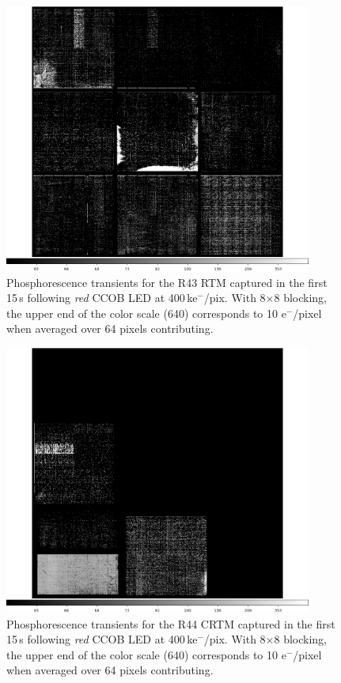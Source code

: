\begin{figure}[!htbp]
\centering
\includegraphics[width=0.9\textwidth]{figures/phosphorescence-survey/itl_fluor_R43_0-19_rb1_log.png}
\caption{Phosphorescence transients for the R43 RTM captured in the first 15\,s following {\it red} CCOB LED at 400\,ke$^-$/pix. With 8$\times$8 blocking, the upper end of the color scale (640) corresponds to 10 e$^-$/pixel when averaged over 64 pixels contributing.}
\label{fig:phos:R43}
\end{figure}

\begin{figure}[!htbp]
\centering
\includegraphics[width=0.9\textwidth]{figures/phosphorescence-survey/itl_fluor_R44_0-19_rb1_log.png}
\caption{Phosphorescence transients for the R44 CRTM captured in the first 15\,s following {\it red} CCOB LED at 400\,ke$^-$/pix. With 8$\times$8 blocking, the upper end of the color scale (640) corresponds to 10 e$^-$/pixel when averaged over 64 pixels contributing.}
\label{fig:phos:R44}
\end{figure}
